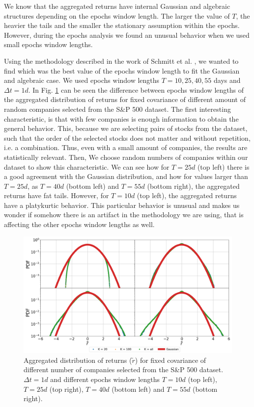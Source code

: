 We know that the aggregated returns have internal Gaussian and algebraic
structures depending on the epochs window length. The larger the value of $T$,
the heavier the tails and the smaller the stationary assumption within the
epochs. However, during the epochs analysis we found an unusual behavior when
we used small epochs window lengths.

Using the methodology described in the work of Schmitt et al.
\cite{non_stationarity_fin_guhr}, we wanted to find which was the best value of
the epochs window length to fit the Gaussian and algebraic case. We used epochs
window lengths $T = 10, 25, 40, 55$ days and $\Delta t = 1d$. In Fig.
\ref{fig:window_comparison} can be seen the difference between epochs
window lengths of the aggregated distribution of returns for fixed covariance
of different amount of random companies selected from the S\&P 500 dataset.
The first interesting characteristic, is that with few companies is enough
information to obtain the general behavior. This, because we are selecting
pairs of stocks from the dataset, such that the order of the selected stocks
does not matter and without repetition, i.e. a combination. Thus, even with
a small amount of companies, the results are statistically relevant. Then, We
choose random numbers of companies within our dataset to show this
characteristic. We can see how for $T=25d$ (top left) there is a good agreement
with the Gaussian distribution, and how for values larger than $T=25d$, as
$T=40d$ (bottom left) and $T=55d$ (bottom right), the aggregated returns have
fat tails. However, for $T=10d$ (top left), the aggregated returns have a
platykurtic behavior. This particular behavior is unusual and makes us wonder
if somehow there is an artifact in the methodology we are using, that is
affecting the other epochs window lengths as well.

\begin{figure}[htbp]
    \centering
    \includegraphics[width=0.8\columnwidth]
    {figures/05_window_comparison.png}
    \caption{Aggregated distribution of returns ($\tilde{r}$) for fixed
             covariance of different number of companies selected from the S\&P
             500 dataset. $\Delta t = 1d$ and different epochs window lengths
             $T=10d$ (top left), $T=25d$ (top right), $T=40d$ (bottom left) and
             $T=55d$ (bottom right).}
    \label{fig:window_comparison}
\end{figure}

